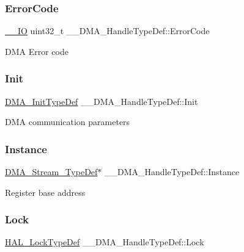 \subsubsection{\texorpdfstring{ErrorCode}{ErrorCode}}
{\footnotesize\ttfamily \mbox{\hyperlink{core__sc300_8h_aec43007d9998a0a0e01faede4133d6be}{\+\_\+\+\_\+\+IO}} uint32\+\_\+t \+\_\+\+\_\+\+D\+M\+A\+\_\+\+Handle\+Type\+Def\+::\+Error\+Code}

D\+MA Error code \mbox{\label{struct_____d_m_a___handle_type_def_a3792cb34cedb0e2ab204e41b53ef75ad}} 
\subsubsection{\texorpdfstring{Init}{Init}}
{\footnotesize\ttfamily \mbox{\hyperlink{struct_d_m_a___init_type_def}{D\+M\+A\+\_\+\+Init\+Type\+Def}} \+\_\+\+\_\+\+D\+M\+A\+\_\+\+Handle\+Type\+Def\+::\+Init}

D\+MA communication parameters \mbox{\label{struct_____d_m_a___handle_type_def_ac4b645b1c2beb1107dbec7dae98747e1}} 
\subsubsection{\texorpdfstring{Instance}{Instance}}
{\footnotesize\ttfamily \mbox{\hyperlink{struct_d_m_a___stream___type_def}{D\+M\+A\+\_\+\+Stream\+\_\+\+Type\+Def}}$\ast$ \+\_\+\+\_\+\+D\+M\+A\+\_\+\+Handle\+Type\+Def\+::\+Instance}

Register base address \mbox{\label{struct_____d_m_a___handle_type_def_a005e867f695aa4b85aca665af7345b51}} 
\subsubsection{\texorpdfstring{Lock}{Lock}}
{\footnotesize\ttfamily \mbox{\hyperlink{stm32f7xx__hal__def_8h_ab367482e943333a1299294eadaad284b}{H\+A\+L\+\_\+\+Lock\+Type\+Def}} \+\_\+\+\_\+\+D\+M\+A\+\_\+\+Handle\+Type\+Def\+::\+Lock}

